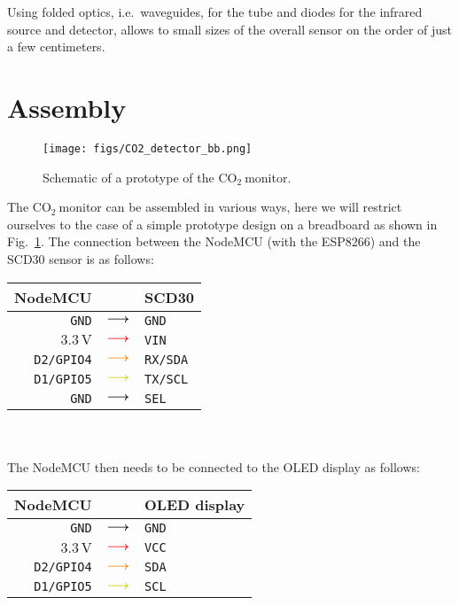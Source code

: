 \documentclass[12pt,a4paper]{article}
\newcommand*{\mathcolor}{}
\def\mathcolor#1#{\mathcoloraux{#1}}
\newcommand*{\mathcoloraux}[3]{%
  \protect\leavevmode
  \begingroup
    \color#1{#2}#3%
  \endgroup
}
\newcommand{\coo}{\ensuremath{\mathrm{CO_2}~}}
\begin{document}
Using folded optics, i.e.\ waveguides, for the tube and diodes for the infrared source and detector, allows to small sizes of the overall sensor on the order of just a few centimeters.


\section{Assembly}
\begin{figure}[ht]
\center
\texttt{[image: figs/CO2\_detector\_bb.png]}
\caption{Schematic of a prototype of the \coo monitor.}
\label{f:CO2_fritzing}
\end{figure}
The \coo monitor can be assembled in various ways, here we will restrict ourselves to the case of a simple prototype design on a breadboard as shown in Fig.~\ref{f:CO2_fritzing}. The connection between the NodeMCU (with the ESP8266) and the SCD30 sensor is as follows:\\

\begin{tabular}{rcl}\toprule
	NodeMCU		& & SCD30\\\hline
	\texttt{GND}		& $\mathcolor{black}{\boldsymbol{\longrightarrow}}$	& \texttt{GND}\\
	$3.3\,\mathrm{V}$	& $\mathcolor{red}{\boldsymbol{\longrightarrow}}$		& \texttt{VIN}\\
	\texttt{D2/GPIO4}	& $\mathcolor{orange}{\boldsymbol{\longrightarrow}}$	& \texttt{RX/SDA}\\
	\texttt{D1/GPIO5}	& $\mathcolor{Yellow3}{\boldsymbol{\longrightarrow}}$	& \texttt{TX/SCL}\\
	\texttt{GND}		& $\mathcolor{black}{\boldsymbol{\longrightarrow}}$	& \texttt{SEL}\\	
	\bottomrule
\end{tabular}\\
\quad\\

The NodeMCU then needs to be connected to the OLED display as follows:\\

\begin{tabular}{rcl}\toprule
	NodeMCU		& & OLED display\\\hline
	\texttt{GND}		& $\mathcolor{black}{\boldsymbol{\longrightarrow}}$	& \texttt{GND}\\
	$3.3\,\mathrm{V}$	& $\mathcolor{red}{\boldsymbol{\longrightarrow}}$		& \texttt{VCC}\\
	\texttt{D2/GPIO4}	& $\mathcolor{orange}{\boldsymbol{\longrightarrow}}$ 	& \texttt{SDA}\\
	\texttt{D1/GPIO5}	& $\mathcolor{Yellow3}{\boldsymbol{\longrightarrow}}$	& \texttt{SCL}\\
	\bottomrule
\end{tabular}\\
\quad\\
\end{document}
